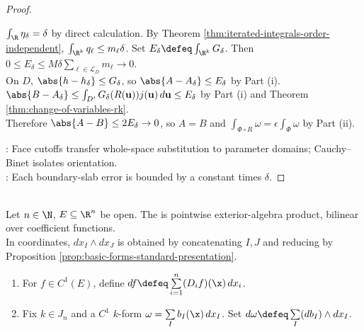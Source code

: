\begin{theorem}
\begin{proof}
\begin{enumerate}[label=(\roman*)]
$\int_\R\eta_\delta=\delta$ by direct calculation. By Theorem \ref{thm:iterated-integrals-order-independent}, $\int_{\R^k}q_\ell\leq m_\ell\delta$. Set $E_\delta\defeq\int_{\R^k}G_\delta$. Then $0\leq E_\delta\leq M\delta\sum\limits_{\ell\in\mathcal L_D}m_\ell\to0$.\\
On $D$, $\abs{h-h_\delta}\leq G_\delta$, so $\abs{A-A_\delta}\leq E_\delta$ by Part (i). $\abs{B-A_\delta}\leq\int_{D'}G_\delta(R(\mathbf u))j(\mathbf u)\,d\mathbf u\leq E_\delta$ by Part (i) and Theorem \ref{thm:change-of-variables-rk}.\\
Therefore $\abs{A-B}\leq2E_\delta\to0$, so $A=B$ and $\int_{\Phi\circ R}\omega=\epsilon\int_\Phi\omega$ by Part (ii).
\end{enumerate}
: Face cutoffs transfer whole-space substitution to parameter domains; Cauchy--Binet isolates orientation.\\
: Each boundary-slab error is bounded by a constant times $\delta$.
\end{proof}
\end{theorem}

\begin{definition} \label{def:wedge-product-and-exterior-derivative} \\
Let $n\in\N$, $E\subseteq\R^n$ be open. The  is pointwise exterior-algebra product, bilinear over coefficient functions.\\
In coordinates, $dx_I\wedge dx_J$ is obtained by concatenating $I,J$ and reducing by Proposition \ref{prop:basic-forms-standard-presentation}.
\begin{enumerate}[label=(\roman*)]
\setlength{\itemsep}{0pt}
\item For $f\in C^1(E)$, define $df\defeq\sum\limits_{i=1}^{n}(D_if)(\x)\,dx_i$.
\item Fix $k\in J_n$ and a $C^1$ $k$-form $\omega=\sum\limits_I b_I(\x)\,dx_I$. Set $d\omega\defeq\sum\limits_I (db_I)\wedge dx_I$.
\end{enumerate}
\end{definition}

